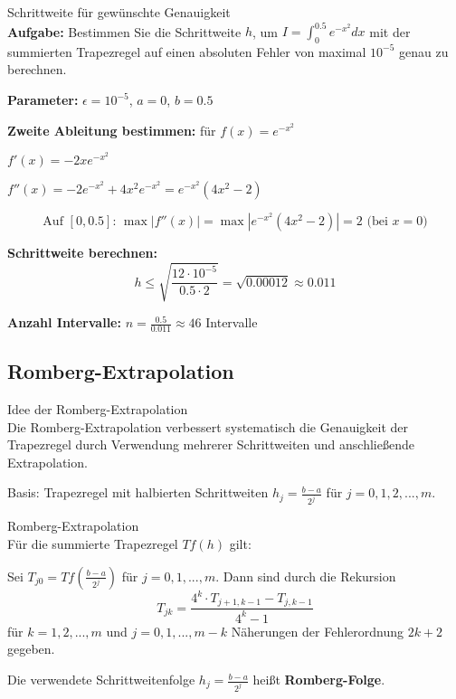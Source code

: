 \begin{example2}{Schrittweite für gewünschte Genauigkeit}\\
\textbf{Aufgabe:} Bestimmen Sie die Schrittweite $h$, um $I = \int_0^{0.5} e^{-x^2} dx$ mit der summierten Trapezregel auf einen absoluten Fehler von maximal $10^{-5}$ genau zu berechnen.

\textbf{Parameter:} $\epsilon = 10^{-5}$, $a = 0$, $b = 0.5$

\textbf{Zweite Ableitung bestimmen:} für
$f(x) = e^{-x^2}$

$f'(x) = -2xe^{-x^2}$

$f''(x) = -2e^{-x^2} + 4x^2e^{-x^2} = e^{-x^2}(4x^2 - 2)$

$$\text{Auf } [0, 0.5]\text{: } \max |f''(x)| = \max |e^{-x^2}(4x^2 - 2)| = 2 \text{ (bei $x = 0$)}$$

\textbf{Schrittweite berechnen:}
$$h \leq \sqrt{\frac{12 \cdot 10^{-5}}{0.5 \cdot 2}} = \sqrt{0.00012} \approx 0.011$$

\textbf{Anzahl Intervalle:} $n = \frac{0.5}{0.011} \approx 46$ Intervalle
\end{example2}

\raggedcolumns
\columnbreak

\subsection{Romberg-Extrapolation}

\begin{concept}{Idee der Romberg-Extrapolation}\\
Die Romberg-Extrapolation verbessert systematisch die Genauigkeit der Trapezregel durch Verwendung mehrerer Schrittweiten und anschließende Extrapolation.

Basis: Trapezregel mit halbierten Schrittweiten $h_j = \frac{b-a}{2^j}$ für $j = 0, 1, 2, ..., m$.
\end{concept}

\begin{theorem}{Romberg-Extrapolation}\\
Für die summierte Trapezregel $Tf(h)$ gilt:

Sei $T_{j0} = Tf(\frac{b-a}{2^j})$ für $j = 0, 1, ..., m$. Dann sind durch die Rekursion
$$T_{jk} = \frac{4^k \cdot T_{j+1,k-1} - T_{j,k-1}}{4^k - 1}$$
für $k = 1, 2, ..., m$ und $j = 0, 1, ..., m-k$ Näherungen der Fehlerordnung $2k+2$ gegeben.

Die verwendete Schrittweitenfolge $h_j = \frac{b-a}{2^j}$ heißt \textbf{Romberg-Folge}.
\end{theorem}

